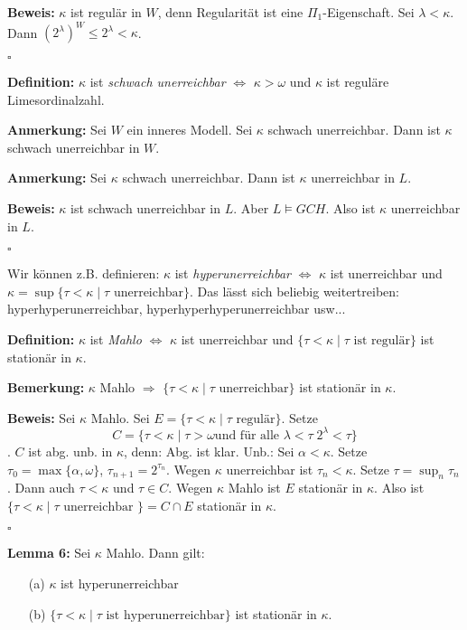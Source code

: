\documentclass[a4paper,fontsize=11pt]{scrartcl}
\begin{document}
{\bf Beweis:} $\kappa$ ist regulär in $W$, denn Regularität ist eine
$\Pi_1$-Eigenschaft. Sei $\lambda<\kappa$. Dann $(2^{\lambda})^W\le
2^{\lambda}<\kappa$.

\hfill $\square$

{\bf Definition:} $\kappa$ ist \emph{schwach unerreichbar} $\iff$
$\kappa>\omega$ und $\kappa$ ist reguläre Limesordinalzahl.

{\bf Anmerkung:} Sei $W$ ein inneres Modell. Sei $\kappa$ schwach
unerreichbar. Dann ist $\kappa$ schwach unerreichbar in $W$.

{\bf Anmerkung:} Sei $\kappa$ schwach unerreichbar. Dann ist $\kappa$ unerreichbar in $L$.

{\bf Beweis:} $\kappa$ ist schwach unerreichbar in $L$. Aber $L\models
GCH$. Also ist $\kappa$ unerreichbar in $L$.

\hfill $\square$

Wir können z.B. definieren: $\kappa$ ist \emph{hyperunerreichbar}
$\iff$ $\kappa$ ist unerreichbar und $\kappa
=\sup\{\tau<\kappa\mid\tau \mbox{ unerreichbar}\}$. Das lässt sich
beliebig weitertreiben: hyperhyperunerreichbar,
hyperhyperhyperunerreichbar usw...

{\bf Definition:} $\kappa$ ist \emph{Mahlo} $\iff$ $\kappa$ ist
unerreichbar und $\{\tau<\kappa\mid \tau \mbox{ ist regulär}\}$ ist
stationär in $\kappa$.

{\bf Bemerkung:} $\kappa$ Mahlo $\Rightarrow$ $\{ \tau<\kappa\mid \tau\mbox{ unerreichbar}\}$ ist stationär in $\kappa$.

{\bf Beweis:} Sei $\kappa$ Mahlo. Sei $E= \{\tau<\kappa\mid \tau
\mbox{ regulär} \}$. Setze \[C=\{ \tau<\kappa\mid \tau>\omega \mbox{
  und für alle }\lambda<\tau\; 2^{\lambda}<\tau\}\]. $C$ ist
abg. unb. in $\kappa$, denn: Abg. ist klar.  Unb.: Sei
$\alpha<\kappa$.  Setze $\tau_0=\max\{\alpha,\omega\}$,
$\tau_{n+1}=2^{\tau_n}$.  Wegen $\kappa$ unerreichbar ist
$\tau_n<\kappa$.  Setze $\tau=\sup_n\tau_n$.  Dann auch $\tau<\kappa$
und $\tau\in C$.  Wegen $\kappa$ Mahlo ist $E$ stationär in $\kappa$.
Also ist $\{\tau<\kappa\mid \tau\mbox{ unerreichbar }\} = C\cap E$
stationär in $\kappa$.

\hfill $\square$

{\bf Lemma 6:} Sei $\kappa$ Mahlo. Dann gilt: 
\begin{itemize}
\item[(a)] $\kappa$ ist hyperunerreichbar
\item[(b)] $\{\tau<\kappa\mid \tau \mbox{ ist hyperunerreichbar}\}$ ist stationär in $\kappa$.
\end{itemize}
\end{document}
